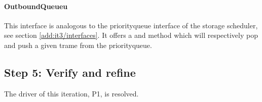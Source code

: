 \paragraph{OutboundQueueu}

\npar This interface is analogous to the priorityqueue interface of the storage
scheduler, see section \ref{add:it3/interfaces}. It offers a 
and  method which will respectively pop and push a given
trame from the priorityqueue.

\subsection{Step 5: Verify and refine}
\label{add:it6/verification}

\npar The driver of this iteration, P1, is resolved.